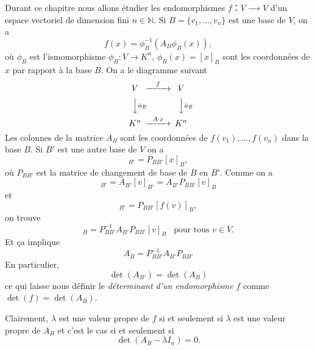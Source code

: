 Durant ce chapitre nous allons étudier les endomorphismes $f：V⟶V$ d'un espace vectoriel de dimension fini $n ∈ ℕ$.  Si  $B = \{v_1,\dots,v_n\}$ est une base de $V$, on a
\begin{displaymath}
  f(x) = \phi_B^{-1} (A_B \phi_B(x)),
\end{displaymath}
où $\phi_B$ est l'ismomorphisme $\phi_B \colon V \longrightarrow K^n$, $\phi_B(x) = [x]_B$ sont les coordonnées de $x$ par rapport à la base $B$. On a le diagramme suivant
\begin{displaymath}
  {
  \begin{CD}
    V     @>f>>  V\\
    @VV \phi_B V        @VV \phi_B V\\
    K^n     @>A \cdot x>>  K^n
  \end{CD}}
\end{displaymath}
Les colonnes de la matrice $A_B$ sont les coordonnées de $f(v_1),\dots,f(v_n)$ dans la base $B$. Si $B'$ est une autre base de $V$ on a
\begin{displaymath}
  [x]_{B'} = P_{BB'}[x]_B,
\end{displaymath}
où $P_{BB'}$ est la matrice de changement de base de $B$ en $B'$. Comme on a
\begin{displaymath}
  [f(v)]_{B'} = A_{B'} [v]_{B'} = A_{B'} P_{BB'}[v]_B
\end{displaymath}
et
\begin{displaymath}
  [f(v)]_{B'} =  P_{BB'}[f(v)]_B,
\end{displaymath}
on trouve
\begin{displaymath}
  [f(v)]_B =  P_{BB'}^{-1}A_{B'} P_{BB'}[v]_B \,\,\,\text{ pour tous } v ∈V.
\end{displaymath}
Et ça implique 
\begin{equation}
  \label{eq:36}
  A_{B} =  P_{BB'}^{-1} A_{B'}  P_{BB'}
\end{equation}
En particulier,
\begin{displaymath}
  \det(A_{B'}) = \det(A_B) 
\end{displaymath}
ce qui laisse nous définir le \emph{déterminant d'un endomorphisme} $f$ comme $\det(f)= \det(A_B)$. 



Clairement, $λ$ est une valeur propre de $f$ si et seulement si $λ$ est une valeur propre de $A_B$ et c'est le cas si et seulement si
\begin{equation}
  \label{eq:30}
  \det(A_B - λ I_n) = 0.
\end{equation}

